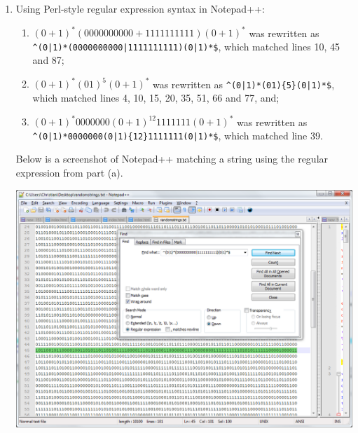 \documentclass[a4paper]{article}
\begin{document}
\begin{enumerate}
		\item Using Perl-style regular expression syntax in Notepad++:
		\begin{enumerate}
			\item $(0 + 1)^*(0000000000 + 1111111111)(0 + 1)^*$ was rewritten as \\
			\verb`^(0|1)*(0000000000|1111111111)(0|1)*$`, which matched lines 10, 45 and 87;
			
			\item $(0 + 1)^*(01)^5(0 + 1)^*$ was rewritten as \verb`^(0|1)*(01){5}(0|1)*$`, which matched lines 4, 10, 15, 20, 35, 51, 66 and 77, and;
			\item $(0 + 1)^*0000000(0+1)^{12}1111111(0 + 1)^*$ was rewritten as \\
			\verb`^(0|1)*0000000(0|1){12}1111111(0|1)*$`, which matched line 39.
		\end{enumerate}
		
		Below is a screenshot of Notepad++ matching a string using the regular expression from part (a).
		
		\includegraphics[width=\textwidth]{screenshot.png}
	\end{enumerate}
\end{document}
